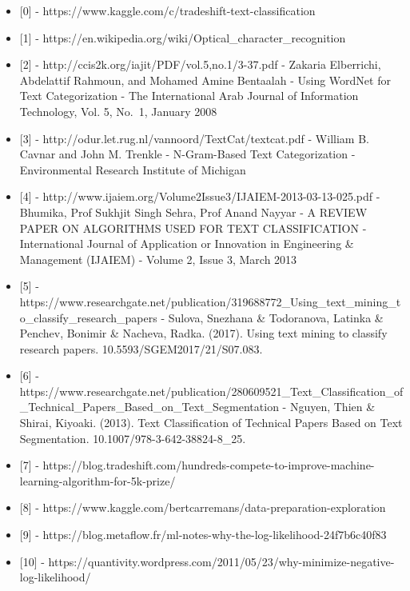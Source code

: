 \documentclass[11pt]{article}
\providecommand{\tightlist}{%
      \setlength{\itemsep}{0pt}\setlength{\parskip}{0pt}}
\begin{document}
\begin{itemize}
\tightlist
\item
  {[}0{]} - https://www.kaggle.com/c/tradeshift-text-classification
\item
  {[}1{]} -
  https://en.wikipedia.org/wiki/Optical\_character\_recognition
\item
  {[}2{]} - http://ccis2k.org/iajit/PDF/vol.5,no.1/3-37.pdf - Zakaria
  Elberrichi, Abdelattif Rahmoun, and Mohamed Amine Bentaalah - Using
  WordNet for Text Categorization - The International Arab Journal of
  Information Technology, Vol. 5, No.~1, January 2008
\item
  {[}3{]} - http://odur.let.rug.nl/vannoord/TextCat/textcat.pdf -
  William B. Cavnar and John M. Trenkle - N-Gram-Based Text
  Categorization - Environmental Research Institute of Michigan
\item
  {[}4{]} -
  http://www.ijaiem.org/Volume2Issue3/IJAIEM-2013-03-13-025.pdf -
  Bhumika, Prof Sukhjit Singh Sehra, Prof Anand Nayyar - A REVIEW PAPER
  ON ALGORITHMS USED FOR TEXT CLASSIFICATION - International Journal of
  Application or Innovation in Engineering \& Management (IJAIEM) -
  Volume 2, Issue 3, March 2013
\item
  {[}5{]} -
  https://www.researchgate.net/publication/319688772\_Using\_text\_mining\_to\_classify\_research\_papers
  - Sulova, Snezhana \& Todoranova, Latinka \& Penchev, Bonimir \&
  Nacheva, Radka. (2017). Using text mining to classify research papers.
  10.5593/SGEM2017/21/S07.083.
\item
  {[}6{]} -
  https://www.researchgate.net/publication/280609521\_Text\_Classification\_of\_Technical\_Papers\_Based\_on\_Text\_Segmentation
  - Nguyen, Thien \& Shirai, Kiyoaki. (2013). Text Classification of
  Technical Papers Based on Text Segmentation.
  10.1007/978-3-642-38824-8\_25.
\item
  {[}7{]} -
  https://blog.tradeshift.com/hundreds-compete-to-improve-machine-learning-algorithm-for-5k-prize/
\item
  {[}8{]} -
  https://www.kaggle.com/bertcarremans/data-preparation-exploration
\item
  {[}9{]} -
  https://blog.metaflow.fr/ml-notes-why-the-log-likelihood-24f7b6c40f83
\item
  {[}10{]} -
  https://quantivity.wordpress.com/2011/05/23/why-minimize-negative-log-likelihood/
\end{itemize}


    
    
    
    
\end{document}

